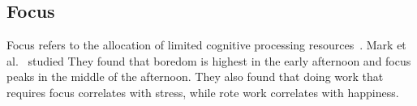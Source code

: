 








\subsection{Focus}
Focus refers to the allocation of limited cognitive processing resources~\cite{Anderson04}.
Mark et al.~\cite{mark2014bored} studied  They found that boredom is highest in the early afternoon and focus peaks in the middle of the afternoon. They also found that doing work that requires focus correlates with stress, while rote work correlates with happiness.

